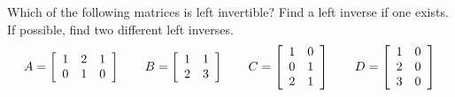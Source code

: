 \documentclass{ximera}
\begin{document}
\begin{example}
  Which of the following matrices is left invertible? Find a left
  inverse if one exists. If possible, find two different left
  inverses.
  \begin{equation*}
    A=\startmat{ccc}
      1 & 2 & 1 \\
      0 & 1 & 0 \\
    \stopmat
    \qquad
    B=\startmat{cc}
      1 & 1 \\
      2 & 3 \\
    \stopmat
    \qquad
    C=\startmat{cc}
      1 & 0 \\
      0 & 1 \\
      2 & 1 \\
    \stopmat
    \qquad
    D=\startmat{cc}
      1 & 0 \\
      2 & 0 \\
      3 & 0 \\
    \stopmat
  \end{equation*}
\end{example}
\end{document}
